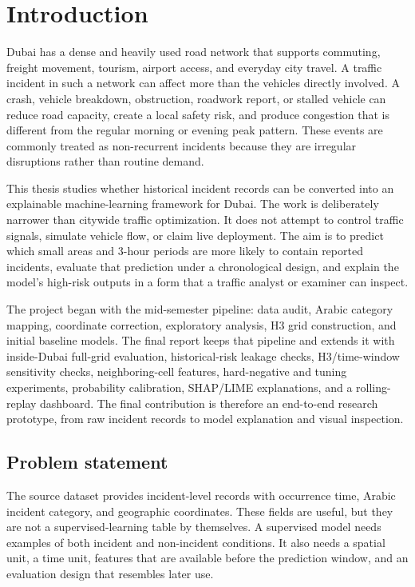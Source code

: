 \chapter{Introduction}

Dubai has a dense and heavily used road network that supports commuting, freight movement, tourism, airport access, and everyday city travel. A traffic incident in such a network can affect more than the vehicles directly involved. A crash, vehicle breakdown, obstruction, roadwork report, or stalled vehicle can reduce road capacity, create a local safety risk, and produce congestion that is different from the regular morning or evening peak pattern. These events are commonly treated as non-recurrent incidents because they are irregular disruptions rather than routine demand.

This thesis studies whether historical incident records can be converted into an explainable machine-learning framework for Dubai. The work is deliberately narrower than citywide traffic optimization. It does not attempt to control traffic signals, simulate vehicle flow, or claim live deployment. The aim is to predict which small areas and 3-hour periods are more likely to contain reported incidents, evaluate that prediction under a chronological design, and explain the model's high-risk outputs in a form that a traffic analyst or examiner can inspect.

The project began with the mid-semester pipeline: data audit, Arabic category mapping, coordinate correction, exploratory analysis, H3 grid construction, and initial baseline models. The final report keeps that pipeline and extends it with inside-Dubai full-grid evaluation, historical-risk leakage checks, H3/time-window sensitivity checks, neighboring-cell features, hard-negative and tuning experiments, probability calibration, SHAP/LIME explanations, and a rolling-replay dashboard. The final contribution is therefore an end-to-end research prototype, from raw incident records to model explanation and visual inspection.

\section{Problem statement}

The source dataset provides incident-level records with occurrence time, Arabic incident category, and geographic coordinates. These fields are useful, but they are not a supervised-learning table by themselves. A supervised model needs examples of both incident and non-incident conditions. It also needs a spatial unit, a time unit, features that are available before the prediction window, and an evaluation design that resembles later use.

